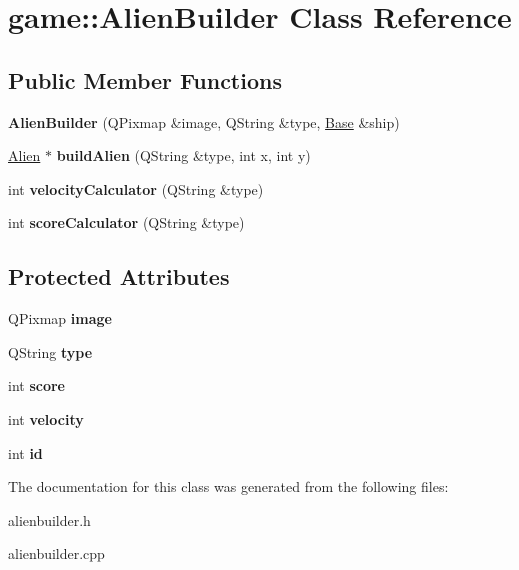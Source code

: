 \hypertarget{classgame_1_1AlienBuilder}{}\section{game\+:\+:Alien\+Builder Class Reference}
\label{classgame_1_1AlienBuilder}
\subsection*{Public Member Functions}
\begin{DoxyCompactItemize}
\item 
\mbox{\label{classgame_1_1AlienBuilder_ad6c526bde63146a07ee233dcc0539c9b}} 
{\bfseries Alien\+Builder} (Q\+Pixmap \&image, Q\+String \&type, \hyperlink{classgame_1_1Base}{Base} \&ship)
\item 
\mbox{\label{classgame_1_1AlienBuilder_aecdd1c6a3b297000e1a6b6bc60416650}} 
\hyperlink{classgame_1_1Alien}{Alien} $\ast$ {\bfseries build\+Alien} (Q\+String \&type, int x, int y)
\item 
\mbox{\label{classgame_1_1AlienBuilder_a6edbcda3787695657edada653dbe3ce3}} 
int {\bfseries velocity\+Calculator} (Q\+String \&type)
\item 
\mbox{\label{classgame_1_1AlienBuilder_ac24663df8d7edc42f69a5ee056a91949}} 
int {\bfseries score\+Calculator} (Q\+String \&type)
\end{DoxyCompactItemize}
\subsection*{Protected Attributes}
\begin{DoxyCompactItemize}
\item 
\mbox{\label{classgame_1_1AlienBuilder_af50d94648522f41480afa57db2450fdf}} 
Q\+Pixmap {\bfseries image}
\item 
\mbox{\label{classgame_1_1AlienBuilder_a20e27658f5a953851271eeb92a81068c}} 
Q\+String {\bfseries type}
\item 
\mbox{\label{classgame_1_1AlienBuilder_aa446e19ea74df3c79d48f708ff440ad6}} 
int {\bfseries score}
\item 
\mbox{\label{classgame_1_1AlienBuilder_a3c7d1c90792cfd67e6fbf744b6ebc4ad}} 
int {\bfseries velocity}
\item 
\mbox{\label{classgame_1_1AlienBuilder_a915690fede0ff0a450a0a84d9ecc127b}} 
int {\bfseries id}
\end{DoxyCompactItemize}


The documentation for this class was generated from the following files\+:\begin{DoxyCompactItemize}
\item 
alienbuilder.\+h\item 
alienbuilder.\+cpp\end{DoxyCompactItemize}

